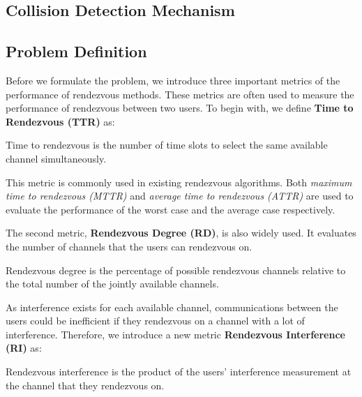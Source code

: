 \subsection{Collision Detection Mechanism}









\subsection{Problem Definition}

Before we formulate the problem, we introduce three important
metrics of the performance of rendezvous methods. These metrics are
often used to measure the performance of rendezvous between two users.
To begin with, we define
\textbf{Time to Rendezvous (TTR)} as:
\begin{definition}
Time to rendezvous is the number of time slots to select the
same available channel simultaneously.%
\end{definition}

This metric is commonly used in existing rendezvous
algorithms. Both \emph{maximum time to rendezvous (MTTR)} and
\emph{average time to rendezvous (ATTR)} are used to evaluate the
performance of the worst case and the average case
respectively\cite{Gu2013,Liu2012a,Yang2015,Ch2014,Chen2014}.

The second metric, \textbf{Rendezvous Degree (RD)}, is also widely
used. It evaluates the number of channels that the users can rendezvous
on.
\begin{definition}
Rendezvous degree is the percentage of possible rendezvous
channels relative to the total number of the jointly available channels.
\end{definition}

As interference exists for each available channel, communications
between the users could be inefficient if they rendezvous on a channel
with a lot of interference.
Therefore, we introduce a new metric \textbf{Rendezvous Interference (RI)} as:
\begin{definition}
Rendezvous interference is the product of the users' interference measurement at
the channel that they rendezvous on.
\end{definition}



